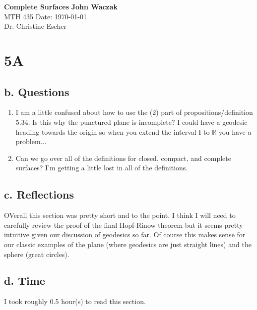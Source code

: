 \documentclass[a4paper, 11pt]{article}
\begin{document}
\noindent
\large\textbf{Complete Surfaces} \hfill \textbf{John Waczak} \\
\normalsize MTH 435 \hfill  Date: \today \\
Dr. Christine Escher \\

\section*{5A}
\subsection*{b. Questions}
	\begin{enumerate}
		\item I am a little confused about how to use the (2) part of propositions/definition 5.34. Is this why the punctured plane is incomplete? I could have a geodesic heading towards the origin so when you extend the interval I to $\mathbb{R}$ you have a problem... 
		\item Can we go over all of the definitions for closed, compact, and complete surfaces? I'm getting a little lost in all of the definitions. 
	\end{enumerate}
\subsection*{c. Reflections}
		OVerall this section was pretty short and to the point. I think I will need to carefully review the proof of the final Hopf-Rinow theorem but it seems pretty intuitive given our discussion of geodesics so far. Of course this makes sense for our classic examples of the plane (where geodesics are just straight lines) and the sphere (great circles).
\subsection*{d. Time}
I took roughly 0.5 hour(s) to read this section. 
\end{document}
